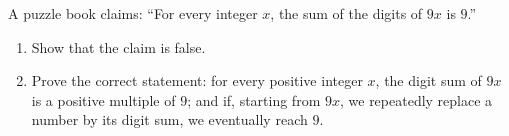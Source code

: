 A puzzle book claims: ``For every integer $x$, the sum of the digits of $9x$ is $9$.''
\begin{enumerate}
\item[(a)] Show that the claim is false.
\item[(b)] Prove the correct statement: for every positive integer $x$, the digit sum of $9x$ is a positive multiple of $9$; and if, starting from $9x$, we repeatedly replace a number by its digit sum, we eventually reach $9$.
\end{enumerate}
